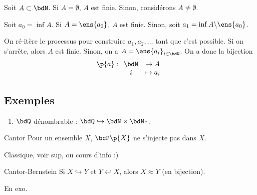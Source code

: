 \documentclass[a4paper,french,bookmarks]{book}
\begin{document}
    \begin{nproof}
        Soit $A \subset \bdN$. Si $A = \emptyset$, $A$ est finie. Sinon, considérons $A \neq \emptyset$.
        
        Soit $a_0 = \inf A$. Si $A = \ens{a_0}$, $A$ est finie. Sinon, soit $a_1 = \inf A \backslash \ens{a_0}$.\medskip
        
        On ré-itère le processus pour construire $a_1, a_2, \dots$ tant que c'est possible. Si on s'arrête, alors $A$ est finie. Sinon, on a $A = \ens{a_i}_{i \in \bdN}$. On a donc la bijection
        \[ \p{a} : \begin{array}[t]{ccc}
            \bdN &\to A  \\
            i &\mapsto a_i 
        \end{array}\]
    \end{nproof}
    
    \subsection{Exemples}
    
    \begin{enumerate}
        \itt $A$ et $B$ dénombrables $\implies A \cup B$ dénombrable. Par exemple :
        \[ 2\bdN \cup 2\bdN + 1 = \bdN\]
        
        \itt $A$ et $B$ dénombrables $\implies A \times B$ dénombrable. Notamment, $N \times \bdN$ dénombrable : carré et diagonales.
        
        \item $\bdQ$ dénombrable : $\bdQ \hookrightarrow \bdN \times \bdN*$.
    \end{enumerate}
    
    \begin{property}{Cantor}{}
        Pour un ensemble $X$, $\bcP\p{X}$ ne s'injecte pas dans $X$.
    \end{property}
    
    \begin{nproof}
        Classique, voir sup, ou cours d'info :)
    \end{nproof}
    
    \begin{property}{Cantor-Bernstein}
        Si $X \hookrightarrow Y$ et $Y \hookleftarrow X$, alors $X \approx Y$ (en bijection). 
    \end{property}
    
    \begin{nproof}
        En exo.
    \end{nproof}
    
\end{document}
